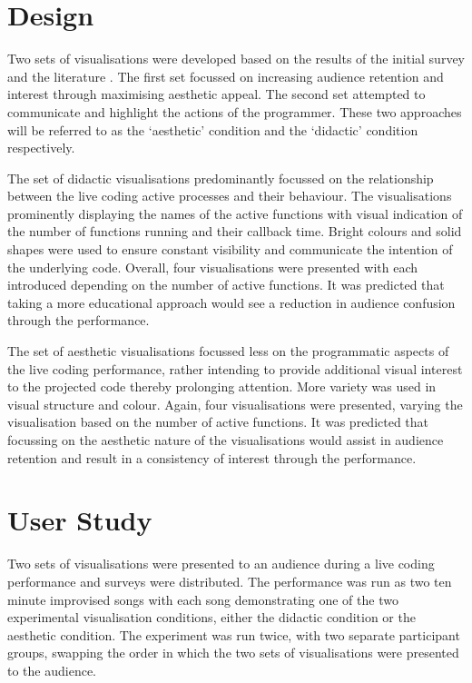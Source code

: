 \documentclass{sig-alternate}
\begin{document}
\section{Design}

Two sets of visualisations were developed based on the results of the initial survey and the literature . The first set focussed on increasing audience retention and interest through maximising aesthetic appeal. The second set attempted to communicate and highlight the actions of the programmer. These two approaches will be referred to as the `aesthetic' condition and the `didactic' condition respectively.





The set of didactic visualisations predominantly focussed on the relationship between the live coding active processes and their behaviour. The visualisations prominently displaying the names of the active functions with visual indication of the number of functions running and their callback time. Bright colours and solid shapes were used to ensure constant visibility and communicate the intention of the underlying code. Overall, four visualisations were presented with each introduced depending on the number of active functions. It was predicted that taking a more educational approach would see a reduction in audience confusion through the performance.

The set of aesthetic visualisations focussed less on the programmatic aspects of the live coding performance, rather intending to provide additional visual interest to the projected code thereby prolonging attention. More variety was used in visual structure and colour. Again, four visualisations were presented, varying the visualisation based on the number of active functions. It was predicted that focussing on the aesthetic nature of the visualisations would assist in audience retention and result in a consistency of interest through the performance.

\section{User Study}

Two sets of visualisations were presented to an audience during a live coding performance and surveys were distributed. The performance was run as two ten minute improvised songs with each song demonstrating one of the two experimental visualisation conditions, either the didactic condition or the aesthetic condition. The experiment was run twice, with two separate participant groups, swapping the order in which the two sets of visualisations were presented to the audience.
\end{document}
